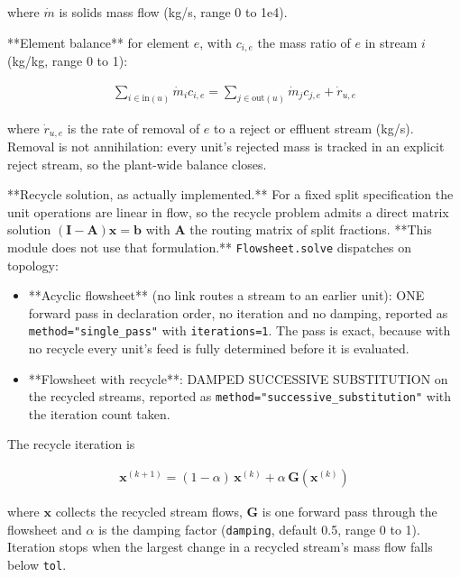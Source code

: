 \documentclass[10pt,a4paper,twoside]{report}
\begin{document}
where $\dot m$ is solids mass flow (kg/s, range 0 to 1e4).

**Element balance** for element $e$, with $c_{i,e}$ the mass ratio of $e$ in stream $i$ (kg/kg, range 0 to 1):

\begin{equation*}
\begin{gathered}
\sum_{i \in \mathrm{in}(u)} \dot m_i c_{i,e} = \sum_{j \in \mathrm{out}(u)} \dot m_j c_{j,e} + \dot r_{u,e}
\end{gathered}
\end{equation*}

where $\dot r_{u,e}$ is the rate of removal of $e$ to a reject or effluent stream (kg/s). Removal is not annihilation: every unit's rejected mass is tracked in an explicit reject stream, so the plant-wide balance closes.

**Recycle solution, as actually implemented.** For a fixed split specification the unit operations are linear in flow, so the recycle problem admits a direct matrix solution $(\mathbf{I} - \mathbf{A})\mathbf{x} = \mathbf{b}$ with $\mathbf{A}$ the routing matrix of split fractions. **This module does not use that formulation.** \texttt{Flowsheet.solve} dispatches on topology:

\begin{itemize}
\item **Acyclic flowsheet** (no link routes a stream to an earlier unit): ONE forward pass in declaration order, no iteration and no damping, reported as \texttt{method="single\_pass"} with \texttt{iterations=1}. The pass is exact, because with no recycle every unit's feed is fully determined before it is evaluated.
\item **Flowsheet with recycle**: DAMPED SUCCESSIVE SUBSTITUTION on the recycled streams, reported as \texttt{method="successive\_substitution"} with the iteration count taken.
\end{itemize}

The recycle iteration is

\begin{equation*}
\begin{gathered}
\mathbf{x}^{(k+1)} = (1 - \alpha)\,\mathbf{x}^{(k)} + \alpha\, \mathbf{G}\!\left(\mathbf{x}^{(k)}\right)
\end{gathered}
\end{equation*}

where $\mathbf{x}$ collects the recycled stream flows, $\mathbf{G}$ is one forward pass through the flowsheet and $\alpha$ is the damping factor (\texttt{damping}, default 0.5, range 0 to 1). Iteration stops when the largest change in a recycled stream's mass flow falls below \texttt{tol}.
\end{document}
